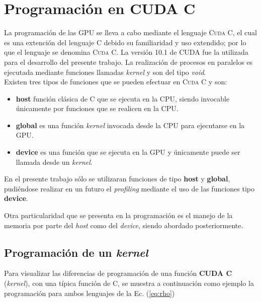 \section{Programación en CUDA C}

La programación de las GPU se lleva a cabo mediante el lenguaje \textsc{Cuda C}, el cual es una extención del lenguaje \textsc{C} debido su familiaridad y uso extendido; por lo que el lenguaje se denomina \textsc{Cuda C}. La versión 10.1 de CUDA fue la utilizada para el desarrollo del presente trabajo. La realización de procesos en paralelos es ejecutada mediante funciones llamadas \textit{kernel} y son del tipo \textit{void}.
\\

Existen tres tipos de funciones que se pueden efectuar en \textsc{Cuda C} y son:

\begin{itemize}
	
	\item \textbf{host} función clásica de C que se ejecuta en la CPU, siendo invocable únicamente por funciones que se realicen en la CPU. 

	\item \textbf{global} es una función \textit{kernel} invocada desde la CPU para ejecutarse en la GPU. 
	
	\item \textbf{device} es una función que se ejecuta en la GPU y únicamente puede ser llamada desde un \textit{kernel}.
	
\end{itemize}

En el presente trabajo sólo se utilizaran funciones de tipo \textbf{host} y \textbf{global}, pudiéndose realizar en un futuro el  \textit{profiling} mediante el uso de las funciones tipo \textbf{device}.

Otra particularidad que se presenta en la programación es el manejo de la memoria por parte del \textit{host} como del \textit{device}, siendo abordado posteriormente.


\subsection{Programación de un \textit{kernel}}

Para visualizar las diferencias de programación de una función \textbf{CUDA C } (\textit{kernel}), con una típica función de \textsc{C}, se muestra a continuación como ejemplo la programación para ambos lenguajes de la Ec. (\ref{eq:rho})


